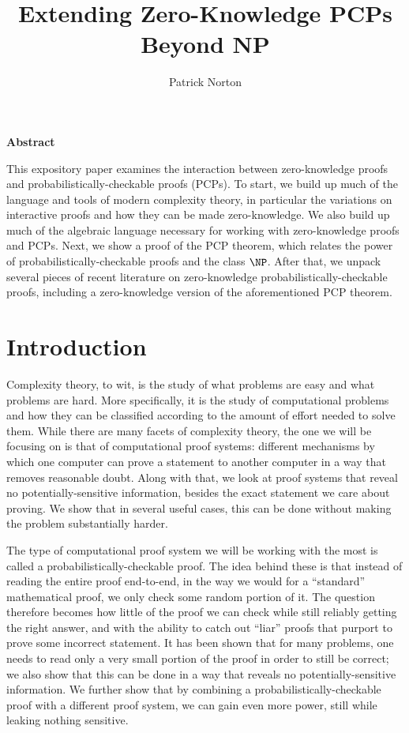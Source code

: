 \documentclass[english,12pt]{reedthesis}
\title{Extending Zero-Knowledge PCPs Beyond NP}
\author{Patrick Norton}
\makeatletter
\theoremstyle{plain}
\theoremstyle{definition}
\theoremstyle{remark}
\renewenvironment{abstract}{%
  \if@twocolumn
    \@restonecoltrue\onecolumn
  \else
    \@restonecolfalse
  \fi
  \chapter*{}
  \begin{center}
  {\fontsize{14}{16}\selectfont \bfseries Abstract}
  \end{center}
  \fontsize{12}{14}\selectfont
}{\clearpage \if@restonecol\twocolumn\fi}%
\makeatother
\begin{document}
\maketitle

\tableofcontents

\listofalgorithms

\begin{abstract}
  This expository paper examines the interaction between zero-knowledge proofs
  and probabilistically-checkable proofs (PCPs). To start, we build up much of
  the language and tools of modern complexity theory, in particular the
  variations on interactive proofs and how they can be made zero-knowledge. We
  also build up much of the algebraic language necessary for working with
  zero-knowledge proofs and PCPs. Next, we show a proof of the PCP theorem,
  which relates the power of probabilistically-checkable proofs and the class
  $\NP$. After that, we unpack several pieces of recent literature on
  zero-knowledge probabilistically-checkable proofs, including a zero-knowledge
  version of the aforementioned PCP theorem.
\end{abstract}

\chapter{Introduction}

Complexity theory, to wit, is the study of what problems are easy and what
problems are hard. More specifically, it is the study of computational problems
and how they can be classified according to the amount of effort needed to solve
them. While there are many facets of complexity theory, the one we will be
focusing on is that of computational proof systems: different mechanisms by
which one computer can prove a statement to another computer in a way that
removes reasonable doubt. Along with that, we look at proof systems that reveal
no potentially-sensitive information, besides the exact statement we care about
proving. We show that in several useful cases, this can be done without making
the problem substantially harder.

The type of computational proof system we will be working with the most is
called a probabilistically-checkable proof. The idea behind these is that
instead of reading the entire proof end-to-end, in the way we would for a
``standard'' mathematical proof, we only check some random portion of it. The
question therefore becomes how little of the proof we can check while still
reliably getting the right answer, and with the ability to catch out ``liar''
proofs that purport to prove some incorrect statement. It has been shown that
for many problems, one needs to read only a very small portion of the proof in
order to still be correct; we also show that this can be done in a way that
reveals no potentially-sensitive information. We further show that by combining
a probabilistically-checkable proof with a different proof system, we can gain
even more power, still while leaking nothing sensitive.
\end{document}

